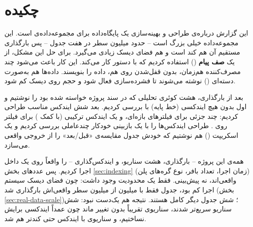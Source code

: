 \section*{چکیده}

این گزارش درباره‌ی طراحی و بهینه‌سازی یک پایگاه‌داده  برای مجموعه‌داده‌ی  است. این مجموعه‌داده خیلی بزرگ است -- حدود  میلیون سطر در هفت جدول -- پس بارگذاری مستقیم آن هم کند است و هم فضای دیسک زیادی می‌گیرد. برای حل این مشکل، از یک \textbf{صف پیام} () استفاده کردیم که با دستور  کار می‌کند. این کار باعث می‌شود چند مصرف‌کننده هم‌زمان، بدون قفل‌شدن روی هم، داده را بنویسند. داده‌ها هم به‌صورت دسته‌ای () نوشته می‌شوند تا فشرده‌سازی  فعال شود و حجم روی دیسک کم شود.

بعد از بارگذاری، هشت کوئری تحلیلی که در سند پروژه خواسته شده بود را نوشتیم و اول بدون هیچ ایندکسی (خط پایه) با  بررسی کردیم. بعد شش ایندکس مناسب طراحی کردیم: چند  جزئی برای فیلترهای بازه‌ای، و یک ایندکس  ترکیبی (با کمک ) برای فیلتر روی . طراحی ایندکس‌ها را با یک بازبینی خودکار چندعاملی بررسی کردیم و یک اسکریپت () هم نوشتیم که خودش جدول مقایسه‌ی «قبل/بعد» را از خروجی واقعی می‌سازد.

همه‌ی این پروژه -- بارگذاری، هشت سناریو، و ایندکس‌گذاری -- را واقعاً روی یک  داخل  اجرا کردیم. پس عددهای بخش \ref{sec:indexing} (زمان اجرا، تعداد بافر، نوع گره‌های پلن) واقعی‌اند، نه پیش‌بینی. فقط یک محدودیت وجود داشت: چون فضای دیسک سیستم اجرا کم بود، جدول  فقط با  میلیون از  میلیون سطر واقعی‌اش بارگذاری شد (بخش \ref{sec:real-data-scale})؛ شش جدول دیگر کامل هستند. نتیجه هم یک‌دست نبود: شش سناریو سریع‌تر شدند، سناریوی  تقریباً بدون تغییر ماند چون عمداً ایندکسی برایش نساختیم، و سناریوی  با ایندکس  حتی کندتر هم شد.

